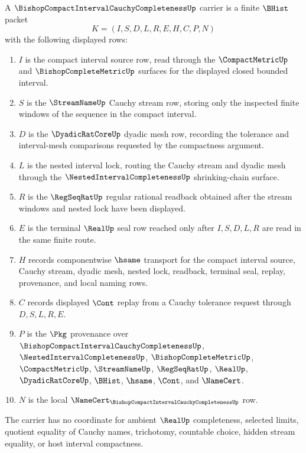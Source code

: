\begin{definition}
\label{def:bishop-compact-interval-cauchy-completeness-carrier}
A $\BishopCompactIntervalCauchyCompletenessUp$ carrier is a finite $\BHist$ packet
$$
K=(I,S,D,L,R,E,H,C,P,N)
$$
with the following displayed rows:
\begin{enumerate}
\item $I$ is the compact interval source row, read through the $\CompactMetricUp$ and $\BishopCompleteMetricUp$ surfaces for the displayed closed bounded interval.
\item $S$ is the $\StreamNameUp$ Cauchy stream row, storing only the inspected finite windows of the sequence in the compact interval.
\item $D$ is the $\DyadicRatCoreUp$ dyadic mesh row, recording the tolerance and interval-mesh comparisons requested by the compactness argument.
\item $L$ is the nested interval lock, routing the Cauchy stream and dyadic mesh through the $\NestedIntervalCompletenessUp$ shrinking-chain surface.
\item $R$ is the $\RegSeqRatUp$ regular rational readback obtained after the stream windows and nested lock have been displayed.
\item $E$ is the terminal $\RealUp$ seal row reached only after $I,S,D,L,R$ are read in the same finite route.
\item $H$ records componentwise $\hsame$ transport for the compact interval source, Cauchy stream, dyadic mesh, nested lock, readback, terminal seal, replay, provenance, and local naming rows.
\item $C$ records displayed $\Cont$ replay from a Cauchy tolerance request through $D,S,L,R,E$.
\item $P$ is the $\Pkg$ provenance over $\BishopCompactIntervalCauchyCompletenessUp$, $\NestedIntervalCompletenessUp$, $\BishopCompleteMetricUp$, $\CompactMetricUp$, $\StreamNameUp$, $\RegSeqRatUp$, $\RealUp$, $\DyadicRatCoreUp$, $\BHist$, $\hsame$, $\Cont$, and $\NameCert$.
\item $N$ is the local $\NameCert_{\BishopCompactIntervalCauchyCompletenessUp}$ row.
\end{enumerate}
The carrier has no coordinate for ambient $\RealUp$ completeness, selected limits, quotient equality of Cauchy names, trichotomy, countable choice, hidden stream equality, or host interval compactness.
\end{definition}

